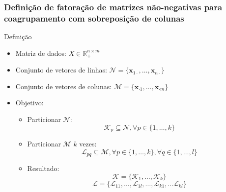 \documentclass[10pt]{beamer}
\begin{document}
\begin{frame} %
\frametitle{Definição de fatoração de matrizes não-negativas para coagrupamento com sobreposição de colunas}

  \begin{block}{Definição}
    \begin{itemize}
      \item Matriz de dados: $X \in \mathbb{R}^{n \times m}_{+}$
      \item Conjunto de vetores de linhas:
        $\mathcal{N} = \{ \mathbf{x}_{1 \cdot}, \dots, \mathbf{x}_{n \cdot} \}$
      \item Conjunto de vetores de colunas:
        $\mathcal{M} = \{ \mathbf{x}_{\cdot 1}, \dots, \mathbf{x}_{\cdot m} \}$
    \end{itemize}
  \end{block}

  \begin{itemize}
  \item Objetivo:
        \begin{itemize}
          \item Particionar $\mathcal{N}$:
            $$\mathcal{K}_p \subseteq \mathcal{N}, \forall p \in \{ 1, \dots, k\}$$
          \item Particionar $\mathcal{M}$ $k$ vezes:
            $$\mathcal{L}_{pq} \subseteq \mathcal{M}, \forall p \in \{ 1, \dots, k\}, \forall q \in \{1, \dots, l\}$$
          \item Resultado:
            $$\mathscr{K} = \{\mathcal{K}_1, \dots, \mathcal{K}_k\}$$
            $$\mathscr{L} = \{\mathcal{L}_{11}, \dots, \mathcal{L}_{1l}, \dots, \mathcal{L}_{k1}, \dots \mathcal{L}_{kl}\}$$
        \end{itemize}
    \end{itemize}

\end{frame}


\end{document}
